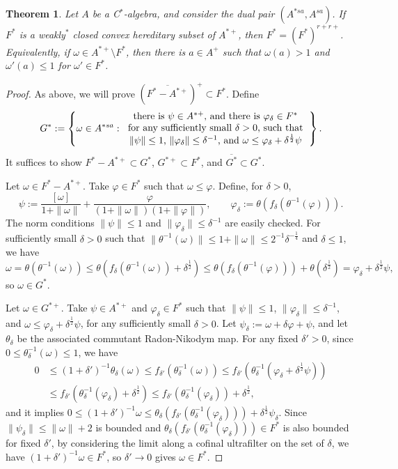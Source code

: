 \documentclass[noamsfonts,a4paper,10pt]{amsart}
\theoremstyle{plain}
\newtheorem{thm}{Theorem}[section]
\theoremstyle{definition}
\theoremstyle{remark}
\begin{document}
\begin{thm}
Let $A$ be a C$^*$-algebra, and consider the dual pair $(A^{*sa},A^{sa})$.
If $F^*$ is a weakly$^*$ closed convex hereditary subset of $A^{*+}$, then $F^*=(F^*)^{r+r+}$.
Equivalently, if $\omega\in A^{*+}\setminus F^*$, then there is $a\in A^+$ such that $\omega(a)>1$ and $\omega'(a)\le1$ for $\omega'\in F^*$.
\end{thm}
\begin{proof}
As above, we will prove $(\overline{F^*-A^{*+}})^+\subset F^*$.
Define
\[G^*:=\left\{\omega\in A^{*sa}:\begin{tabular}{c}
there is $\psi\in A^{*+}$, and there is $\varphi_\delta\in F^*$ \\
for any sufficiently small $\delta>0$,
such that\\
$\|\psi\|\le1$, $\|\varphi_\delta\|\le\delta^{-1}$, and $\omega\le\varphi_\delta+\delta^{\frac12}\psi$
\end{tabular}\right\}.\]
It suffices to show $F^*-A^{*+}\subset G^*$, $G^{*+}\subset F^*$, and $\overline{G^*}\subset G^*$.

Let $\omega\in F^*-A^{*+}$.
Take $\varphi\in F^*$ such that $\omega\le\varphi$.
Define, for $\delta>0$,
\[\psi:=\frac{[\omega]}{1+\|\omega\|}+\frac\varphi{(1+\|\omega\|)(1+\|\varphi\|)},\qquad\varphi_\delta:=\theta(f_\delta(\theta^{-1}(\varphi))).\]
The norm conditions $\|\psi\|\le1$ and $\|\varphi_\delta\|\le\delta^{-1}$ are easily checked.
For sufficiently small $\delta>0$ such that $\|\theta^{-1}(\omega)\|\le1+\|\omega\|\le2^{-1}\delta^{-\frac14}$ and $\delta\le1$, we have
\[\omega=\theta(\theta^{-1}(\omega))\le\theta(f_\delta(\theta^{-1}(\omega))+\delta^{\frac12})\le\theta(f_\delta(\theta^{-1}(\varphi)))+\theta(\delta^{\frac12})=\varphi_\delta+\delta^{\frac12}\psi,\]
so $\omega\in G^*$.

Let $\omega\in G^{*+}$.
Take $\psi\in A^{*+}$ and $\varphi_\delta\in F^*$ such that $\|\psi\|\le1$, $\|\varphi_\delta\|\le\delta^{-1}$, and $\omega\le\varphi_\delta+\delta^{\frac12}\psi$, for any sufficiently small $\delta>0$.
Let $\psi_\delta:=\omega+\delta\varphi+\psi$, and let $\theta_\delta$ be the associated commutant Radon-Nikodym map.
For any fixed $\delta'>0$, since $0\le\theta_\delta^{-1}(\omega)\le1$, we have
\begin{align*}
0&\le(1+\delta')^{-1}\theta_\delta(\omega)\le f_{\delta'}(\theta_\delta^{-1}(\omega))\le f_{\delta'}(\theta_\delta^{-1}(\varphi_\delta+\delta^{\frac12}\psi))\\
&\le f_{\delta'}(\theta_\delta^{-1}(\varphi_\delta)+\delta^{\frac12})\le f_{\delta'}(\theta_\delta^{-1}(\varphi_\delta))+\delta^{\frac12},
\end{align*}
and it implies $0\le(1+\delta')^{-1}\omega\le\theta_\delta(f_{\delta'}(\theta_\delta^{-1}(\varphi_\delta)))+\delta^{\frac12}\psi_\delta$.
Since $\|\psi_\delta\|\le\|\omega\|+2$ is bounded and $\theta_\delta(f_{\delta'}(\theta_\delta^{-1}(\varphi_\delta)))\in F^*$ is also bounded for fixed $\delta'$, by considering the limit along a cofinal ultrafilter on the set of $\delta$, we have $(1+\delta')^{-1}\omega\in F^*$, so $\delta'\to0$ gives $\omega\in F^*$.


\end{proof}
\end{document}
